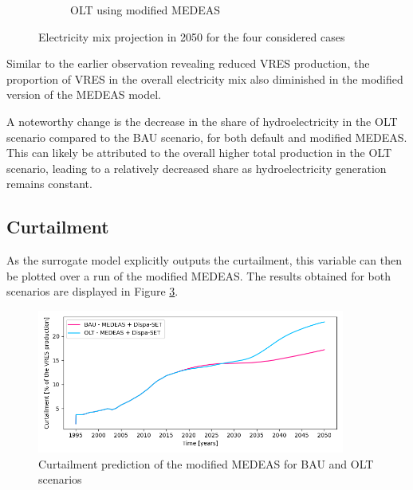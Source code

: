 \begin{figure}[h]
\begin{subfigure}{0.34\textwidth}
        \caption{OLT using modified MEDEAS}
        \label{fig:electricity-mix-OLT-dispa}
    \end{subfigure}
    \caption{Electricity mix projection in 2050 for the four considered cases}
    \label{fig:electricity-mixes}
\end{figure}

Similar to the earlier observation revealing reduced VRES production, the proportion of VRES in the overall electricity mix also diminished in the modified version of the MEDEAS model.

A noteworthy change is the decrease in the share of hydroelectricity in the OLT scenario compared to the BAU scenario, for both default and modified MEDEAS. This can likely be attributed to the overall higher total production in the OLT scenario, leading to a relatively decreased share as hydroelectricity generation remains constant.

\subsection{Curtailment}

As the surrogate model explicitly outputs the curtailment, this variable can then be plotted over a run of the modified MEDEAS. The results obtained for both scenarios are displayed in Figure \ref{fig:electricity-production-curtailed}.

\begin{figure}[h]
    \centering
    \includegraphics[width=0.9\textwidth]{resources/images/electricity-production-curtailed.png}
    \caption{Curtailment prediction of the modified MEDEAS for BAU and OLT scenarios}
    \label{fig:electricity-production-curtailed}
\end{figure}

